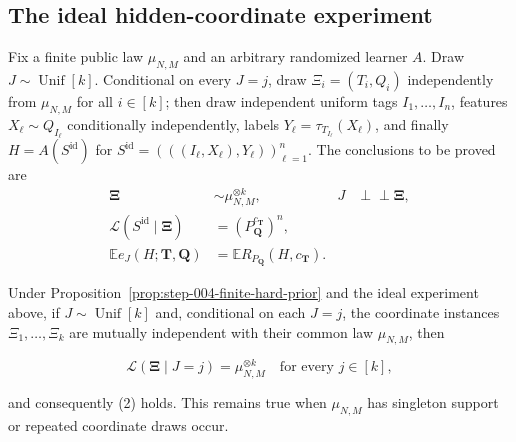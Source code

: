 \subsection{The ideal hidden-coordinate experiment}\label{app:step-008}
Fix a finite public law $\mu_{N,M}$ and an arbitrary randomized learner
$A$.  Draw $J\sim\operatorname{Unif}[k]$.  Conditional on every $J=j$,
draw $\Xi_i=(T_i,Q_i)$ independently from $\mu_{N,M}$ for all $i\in[k]$;
then draw independent uniform tags $I_1,\ldots,I_n$, features
$X_\ell\sim Q_{I_\ell}$ conditionally independently, labels
$Y_\ell=\tau_{T_{I_\ell}}(X_\ell)$, and finally
$H=A(S^{\mathrm{id}})$ for
$S^{\mathrm{id}}=(((I_\ell,X_\ell),Y_\ell))_{\ell=1}^n$.
The conclusions to be proved are
\begin{align}
\boldsymbol\Xi&\sim\mu_{N,M}^{\otimes k},
&J&\perp\!\!\!\perp\boldsymbol\Xi,
\tag{2}\label{eq:ideal-instance-law}\\
\mathcal L(S^{\mathrm{id}}\mid\boldsymbol\Xi)
&=(P_{\boldsymbol Q}^{c_{\boldsymbol T}})^n,
\tag{3}\label{eq:ideal-sample-law}\\
\mathbb E e_J(H;\boldsymbol T,\boldsymbol Q)
&=\mathbb E R_{P_{\boldsymbol Q}}(H,c_{\boldsymbol T}).
\tag{4}\label{eq:ideal-risk-identity}
\end{align}
\begin{lemma}\label{lem:step-008-instance-factorization}
Under Proposition~\ref{prop:step-004-finite-hard-prior} and the
ideal experiment above, if \(J\sim\operatorname{Unif}[k]\) and, conditional
on each \(J=j\), the coordinate instances
\(\Xi_1,\ldots,\Xi_k\) are mutually independent with their common law
\(\mu_{N,M}\), then

\[
\mathcal L(\boldsymbol\Xi\mid J=j)=\mu_{N,M}^{\otimes k}
\quad\text{for every }j\in[k],
\tag{5}
\]

and consequently (2) holds. This remains true when \(\mu_{N,M}\) has
singleton support or repeated coordinate draws occur.
\end{lemma}

